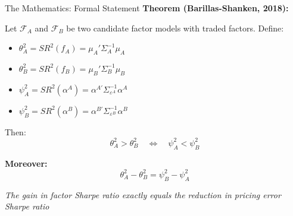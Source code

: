 \documentclass{beamer}
\begin{document}
\begin{frame}{The Mathematics: Formal Statement}
    \textbf{Theorem (Barillas-Shanken, 2018):}
    
    
    Let $\mathcal{F}_A$ and $\mathcal{F}_B$ be two candidate factor models with traded factors. Define:
    
    \begin{itemize}
        \item $\theta_A^2 = SR^2(f_A) = \mu_A' \Sigma_A^{-1} \mu_A$
        \item $\theta_B^2 = SR^2(f_B) = \mu_B' \Sigma_B^{-1} \mu_B$
        \item $\psi_A^2 = SR^2(\alpha^A) = \alpha^{A'} \Sigma_{\varepsilon^A}^{-1} \alpha^A$
        \item $\psi_B^2 = SR^2(\alpha^B) = \alpha^{B'} \Sigma_{\varepsilon^B}^{-1} \alpha^B$
    \end{itemize}
    
    
    Then:
    \begin{equation}\label{eq:theorem}
        \boxed{
        \theta_A^2 > \theta_B^2 \quad \Leftrightarrow \quad \psi_A^2 < \psi_B^2
        }
    \end{equation}
    
    
    \textbf{Moreover:}
    \begin{equation*}
        \theta_A^2 - \theta_B^2 = \psi_B^2 - \psi_A^2
    \end{equation*}
    
    
    \textit{The gain in factor Sharpe ratio exactly equals the reduction in pricing error Sharpe ratio}
\end{frame}
\end{document}
